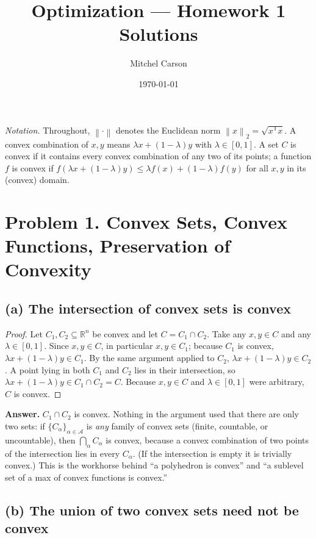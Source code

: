 \documentclass[11pt]{article}
\title{Optimization --- Homework 1 \\ \large Solutions}
\author{Mitchel Carson}
\date{\today}
\newcommand{\R}{\mathbb{R}}
\newcommand{\norm}[1]{\left\lVert #1 \right\rVert}
\newcommand{\T}{^{\mathsf T}}
\newcommand{\lam}{\lambda}
\newcommand{\answer}[1]{\begin{shaded}\noindent\textbf{Answer.} #1\end{shaded}}
\begin{document}
\maketitle

\noindent\textit{Notation.} Throughout, $\norm{\cdot}$ denotes the Euclidean norm $\norm{x}_2=\sqrt{x\T x}$. A convex combination of $x,y$ means $\lam x+(1-\lam)y$ with $\lam\in[0,1]$. A set $C$ is convex if it contains every convex combination of any two of its points; a function $f$ is convex if $f(\lam x+(1-\lam)y)\le \lam f(x)+(1-\lam)f(y)$ for all $x,y$ in its (convex) domain.

\section*{Problem 1. Convex Sets, Convex Functions, Preservation of Convexity}

\subsection*{(a) The intersection of convex sets is convex}

\begin{proof}
Let $C_1,C_2\subseteq\R^n$ be convex and let $C=C_1\cap C_2$. Take any $x,y\in C$ and any $\lam\in[0,1]$. Since $x,y\in C$, in particular $x,y\in C_1$; because $C_1$ is convex, $\lam x+(1-\lam)y\in C_1$. By the same argument applied to $C_2$, $\lam x+(1-\lam)y\in C_2$. A point lying in both $C_1$ and $C_2$ lies in their intersection, so $\lam x+(1-\lam)y\in C_1\cap C_2=C$. Because $x,y\in C$ and $\lam\in[0,1]$ were arbitrary, $C$ is convex.
\end{proof}

\answer{$C_1\cap C_2$ is convex. Nothing in the argument used that there are only two sets: if $\{C_\alpha\}_{\alpha\in\mathcal A}$ is \emph{any} family of convex sets (finite, countable, or uncountable), then $\bigcap_{\alpha}C_\alpha$ is convex, because a convex combination of two points of the intersection lies in every $C_\alpha$. (If the intersection is empty it is trivially convex.) This is the workhorse behind ``a polyhedron is convex'' and ``a sublevel set of a max of convex functions is convex.''}

\subsection*{(b) The union of two convex sets need not be convex}
\end{document}
